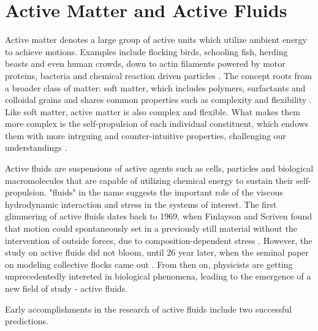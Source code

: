 \section{Active Matter and Active Fluids}
\label{active-fluids}

Active matter denotes a large group of active units which utilize ambient energy to achieve motions. Examples include flocking birds, schooling fish, herding beasts and even human crowds, down to actin filaments powered by motor proteins, bacteria and chemical reaction driven particles
\cite{Toner2005, Ramaswamy2010, Vicsek2012, Marchetti2013, Saintillan2013, Bechinger2016, Julicher2007}. The concept roots from a broader class of matter: soft matter, which includes polymers, surfactants and colloidal grains and shares common properties such as complexity and flexibility
\cite{DeGennes1992}. Like soft matter, active matter is also complex and flexible. What makes them more complex is the self-propulsion of each individual constituent, which endows them with more intrguing and counter-intuitive properties, challenging our understandings \cite{Glotzer2015}.


Active fluids are suspensions of active agents such as cells, particles and biological macromolecules that are capable of utilizing chemical energy to sustain their self-propulsion. "fluids" in the name suggests the important role of the viscous hydrodynamic interaction and stress in the systems of interest. The first glimmering of active fluids dates back to 1969, when Finlayson and Scriven found that motion could spontaneously set in a previously still material without the intervention of outside forces, due to composition-dependent stress \cite{Finlayson1969}. However, the study on active fluids did not bloom, until 26 year later, when the seminal paper on modeling collective flocks came out \cite{Vicsek1995}. From then on, physicists are getting unprecedentedly intereted in biological phenomena, leading to the emergence of a new field of study - active fluids.

Early accomplishments in the research of active fluids include two successful predictions. 




